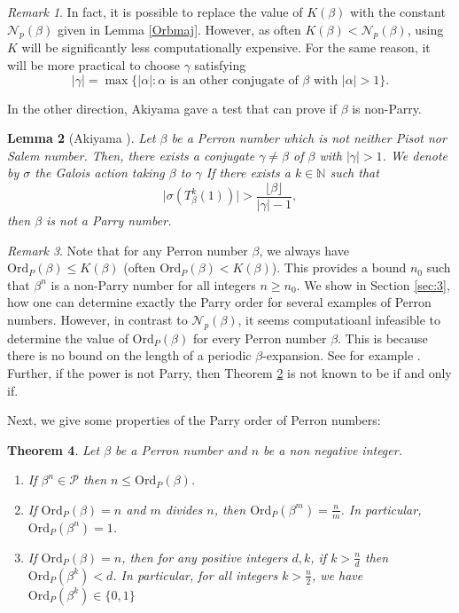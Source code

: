 \documentclass[12pt]{article}
\theoremstyle{plain}
\newtheorem{theorem}{Theorem}[section]
\newtheorem{lemma}[theorem]{Lemma}
\theoremstyle{remark}
\newtheorem{remark}[theorem]{Remark}
\newcommand{\OrdP}{\mathrm{Ord}_{P}}
\begin{document}
\begin{remark}
 In fact, it is possible to replace the value of $K(\beta)$ with the constant $\mathcal{N}_p(\beta)$ given in Lemma \ref{Orbmaj}. However, as often $K(\beta) < \mathcal{N}_p(\beta)$, using $K$ will be significantly less computationally expensive. For the same reason, it will be more practical to choose $\gamma$ satisfying
\[
 |\gamma| = \max\{|\alpha| : \alpha \text{ is an other conjugate of } \beta \text{ with } |\alpha| > 1\}.
\]
\end{remark}

In the other direction, Akiyama gave a test that can prove if $\beta$ is non-Parry.
\begin{lemma}[Akiyama \cite{Akiyama2016}] \label{lem:Akiyama}
Let $\beta$ be a Perron number which is not neither Pisot nor Salem number. Then, there exists a conjugate 
$\gamma \neq \beta$ of $\beta$ with $|\gamma| > 1$. We denote by $\sigma$ the Galois action taking $\beta$ to $\gamma$ If there exists a $k \in \mathbb{N}$ such that 
\[
\big| \sigma(T_\beta^k(1)) \big| > \frac{\lfloor \beta \rfloor}{|\gamma| - 1},
\]
then $\beta$ is not a Parry number.
 \end{lemma} 

 \begin{remark}
    Note that for any Perron number $\beta$, we always have $\OrdP(\beta) \leq K(\beta)$ (often $\OrdP(\beta) < K(\beta)$).  This provides a bound $n_0$ such that $\beta^n$ is a non-Parry number for all integers $n\geq n_0$. We show in Section \ref{sec:3}, how one can determine exactly the Parry order for several examples of Perron numbers. However, in contrast to $\mathcal{N}_p(\beta)$, it seems computatioanl infeasible to determine the value of $\OrdP(\beta)$ for every Perron number $\beta$.  
    This is because there is no bound on the length of a periodic $\beta$-expansion.   See for example \cite{Stockton21}.
 Further, if the power is not Parry, then Theorem \ref{lem:Akiyama} is not known to be if and only if.  
\end{remark}
Next, we give some properties of the Parry order of Perron numbers: 

\begin{theorem}\label{Parryorder}
Let $\beta$ be a Perron number and $n$ be a non negative integer.
\begin{enumerate}
 \item If $\beta^n \in \mathcal{P}$ then $n\leq \OrdP(\beta) $. \label{part:Parryorder 1}
 \item If $ \OrdP(\beta)=n$ and $m$ divides $n$, then $\OrdP(\beta^m)=\frac{n}{m}$. In particular, $ \OrdP(\beta^n)=1$. \label{part:Parryorder 2}
 \item If $\OrdP(\beta)=n$, then for any positive integers $d, k$, if $k>\frac{n}{d}$ then $\OrdP(\beta^k)<d$. In particular, for all integers $k>\frac{n}{2}$, we have $\OrdP(\beta^k) \in \{0,1\}$
\end{enumerate}
\end{theorem}
\end{document}
